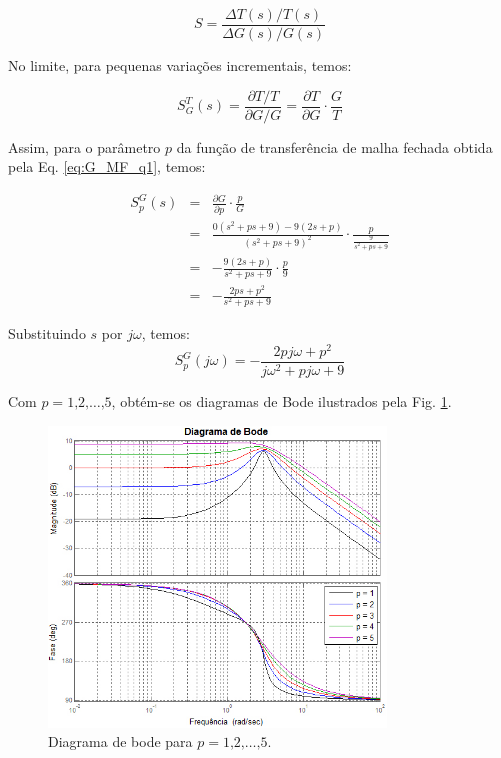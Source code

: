 \documentclass[a4paper,12pt]{article}
\let\D\displaystyle
\begin{document}
\begin{equation}
S = \frac{\Delta T(s)/T(s)}{\Delta G(s)/G(s)}
\end{equation}

No limite, para pequenas variações incrementais, temos:

\begin{equation}
S_G^T(s) = \frac{\partial T / T}{ \partial G / G} 
         = \frac{\partial T}{\partial G} \cdotp \frac{G}{T}
\end{equation}

Assim, para o parâmetro $p$ da função de transferência de malha fechada
obtida pela Eq. \ref{eq:G_MF_q1}, temos:

\begin{eqnarray}
S_p^G(s) & = & \frac{\partial G}{\partial p} \cdotp \frac{p}{G}\nonumber \\
         & = & \frac{0(s^2 + ps + 9) - 9(2s+p)}{(s^2 + ps + 9)^2} \cdotp
               \frac{p}{\D\frac{9}{s^2 + ps + 9}}\nonumber\\
         & = & - \frac{9(2s+p)}{s^2 + ps + 9} \cdotp \frac{p}{9}\nonumber\\
         & = & - \frac{2ps + p^2}{s^2 + ps + 9}
\end{eqnarray}

Substituindo $s$ por $j\omega$, temos:
\begin{equation}
S_p^G(j\omega) = - \frac{2pj\omega + p^2}{j\omega^2 + pj\omega + 9}
\end{equation}

Com $p = 1\text{,} 2\text{,} \ldots\text{,} 5$, obtém-se os diagramas de Bode
ilustrados pela Fig. \ref{fig:diag_bode_q1}.

\begin{figure}[htb]
\centering
    \includegraphics[width=0.8\textwidth]{imgs/questao1/bode}
    \caption{Diagrama de bode para $p = 1\text{,} 2\text{,} \ldots\text{,} 5$.}
    \label{fig:diag_bode_q1}
\end{figure}
\end{document}
